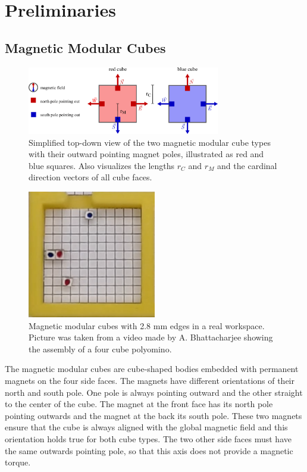 \chapter{Preliminaries}
\label{chap:prelim}


\section{Magnetic Modular Cubes}

\begin{figure}
	\centering
	\includegraphics[width=0.75\textwidth]{figures/magnetic_cubes.pdf}
	\caption[Top-down view of the two magnetic modular cube types]{Simplified top-down view of the two magnetic modular cube types with their outward pointing magnet poles, illustrated as red and blue squares. Also visualizes the lengths $r_C$ and $r_M$ and the cardinal direction vectors of all cube faces.}
	\label{fig:magnetic_cubes}
\end{figure}

\begin{figure}
	\centering
	\includegraphics[width=0.5\textwidth]{figures/real_mmcs.png}
	\caption[Picture of magnetic modular cubes in real workspace]{Magnetic modular cubes with 2.8 mm edges in a real workspace. Picture was taken from a video made by A. Bhattacharjee showing the assembly of a four cube polyomino.}
	\label{fig:real_mmcs}
\end{figure}


The magnetic modular cubes are cube-shaped bodies embedded with permanent magnets on the four side faces.
The magnets have different orientations of their north and south pole. 
One pole is always pointing outward and the other straight to the center of the cube.
The magnet at the front face has its north pole pointing outwards and the magnet at the back its south pole.
These two magnets ensure that the cube is always aligned with the global magnetic field and this orientation holds true for both cube types.
The two other side faces must have the same outwards pointing pole, so that this axis does not provide a magnetic torque.

